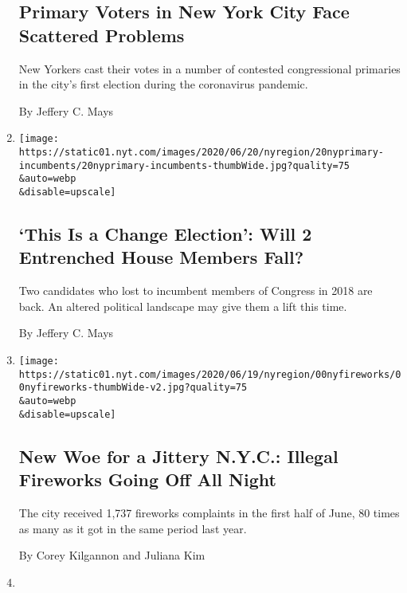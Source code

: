 \begin{enumerate}
  \hypertarget{primary-voters-in-new-york-city-face-scattered-problems}{%
  \subsection{Primary Voters in New York City Face Scattered
  Problems}\label{primary-voters-in-new-york-city-face-scattered-problems}}

  New Yorkers cast their votes in a number of contested congressional
  primaries in the city's first election during the coronavirus
  pandemic.

  By Jeffery C. Mays
\item
  \href{/2020/06/20/nyregion/house-primaries-clarke-maloney-ny.html}{}

  \texttt{[image: https://static01.nyt.com/images/2020/06/20/nyregion/20nyprimary-incumbents/20nyprimary-incumbents-thumbWide.jpg?quality=75\\\&auto=webp\\\&disable=upscale]}

  \hypertarget{this-is-a-change-election-will-2-entrenched-house-members-fall}{%
  \subsection{`This Is a Change Election': Will 2 Entrenched House
  Members
  Fall?}\label{this-is-a-change-election-will-2-entrenched-house-members-fall}}

  Two candidates who lost to incumbent members of Congress in 2018 are
  back. An altered political landscape may give them a lift this time.

  By Jeffery C. Mays
\item
  \href{/2020/06/19/nyregion/fireworks-every-night-nyc.html}{}

  \texttt{[image: https://static01.nyt.com/images/2020/06/19/nyregion/00nyfireworks/00nyfireworks-thumbWide-v2.jpg?quality=75\\\&auto=webp\\\&disable=upscale]}

  \hypertarget{new-woe-for-a-jittery-nyc-illegal-fireworks-going-off-all-night}{%
  \subsection{New Woe for a Jittery N.Y.C.: Illegal Fireworks Going Off
  All
  Night}\label{new-woe-for-a-jittery-nyc-illegal-fireworks-going-off-all-night}}

  The city received 1,737 fireworks complaints in the first half of
  June, 80 times as many as it got in the same period last year.

  By Corey Kilgannon and Juliana Kim
\item
  \href{/2020/06/12/nyregion/de-blasio-blacks-protest.html}{}


\end{enumerate}
